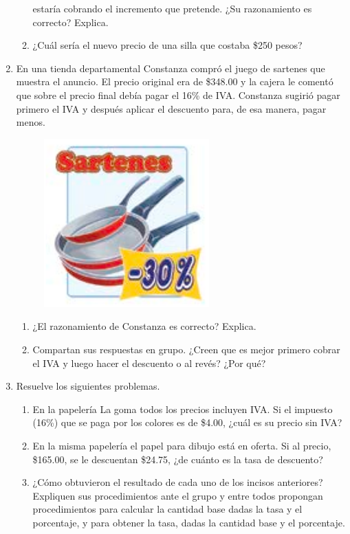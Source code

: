 \documentclass[11pt]{book}
\begin{document}
\begin{enumerate}
\begin{enumerate}
                estaría cobrando el incremento que pretende. ¿Su razonamiento es correcto? Explica.
          \item ¿Cuál sería el nuevo precio de una silla que costaba \$250 pesos?
        \end{enumerate}
  \item En una tienda departamental Constanza compró el juego de sartenes que muestra
        el anuncio. El precio original era de \$348.00 y la cajera le comentó que sobre el
        precio final debía pagar el 16\% de IVA. Constanza sugirió pagar primero el IVA y
        después aplicar el descuento para, de esa manera, pagar menos.
        \begin{figure}[H]
          \centering
          \includegraphics[width=.3\linewidth]{sartenes.png}
          \label{fig:sartenes}
        \end{figure}
        \begin{enumerate}
          \item ¿El razonamiento de Constanza es correcto? Explica.
          \item Compartan sus respuestas en grupo. ¿Creen que es mejor primero cobrar el IVA y
                luego hacer el descuento o al revés? ¿Por qué?
        \end{enumerate}
  \item Resuelve los siguientes problemas.
        \begin{enumerate}
          \item En la papelería La goma todos los precios incluyen IVA. Si el impuesto
                (16\%) que se paga por los colores es de \$4.00, ¿cuál es su precio sin IVA?
          \item En la misma papelería el papel para dibujo está en oferta. Si al precio,
                \$165.00, se le descuentan \$24.75, ¿de cuánto es la tasa de descuento?

          \item ¿Cómo obtuvieron el resultado de cada uno de los incisos anteriores? Expliquen
                sus procedimientos ante el grupo y entre todos propongan procedimientos para
                calcular la cantidad base dadas la tasa y el porcentaje, y para obtener la tasa,
                dadas la cantidad base y el porcentaje.
        \end{enumerate}
\end{enumerate}
\end{document}

